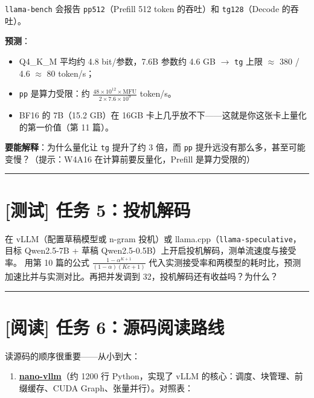 \texttt{llama-bench} 会报告 \texttt{pp512}（Prefill 512 token 的吞吐）和 \texttt{tg128}（Decode 的吞吐）。

\textbf{预测}：
\begin{itemize}
  \item Q4\_K\_M 平均约 4.8 bit/参数，7.6B 参数约 4.6 GB $\rightarrow$ \texttt{tg} 上限 $\approx$ 380 / 4.6 $\approx$ 80 token/s；
  \item \texttt{pp} 是算力受限：约 $\frac{48 \times 10^{12} \times \text{MFU}}{2 \times 7.6 \times 10^9}$ token/s。
  \item BF16 的 7B（15.2 GB）在 16GB 卡上几乎放不下——这就是你这张卡上量化的第一价值（第 11 篇）。
\end{itemize}

\textbf{要能解释}：为什么量化让 \texttt{tg} 提升了约 3 倍，而 \texttt{pp} 提升远没有那么多，甚至可能变慢？（提示：W4A16 在计算前要反量化，Prefill 是算力受限的）

\vspace{0.8em}\hrule\vspace{0.8em}

\section{[测试] 任务 5：投机解码}

在 vLLM（配置草稿模型或 n-gram 投机）或 llama.cpp（\texttt{llama-speculative}，目标 Qwen2.5-7B + 草稿 Qwen2.5-0.5B）上开启投机解码，测单流速度与接受率。
用第 10 篇的公式 $\frac{1 - \alpha^{K+1}}{(1 - \alpha)(Kc + 1)}$ 代入实测接受率和两模型的耗时比，预测加速比并与实测对比。再把并发调到 32，投机解码还有收益吗？为什么？

\vspace{0.8em}\hrule\vspace{0.8em}

\section{[阅读] 任务 6：源码阅读路线}

读源码的顺序很重要——从小到大：

\begin{enumerate}
  \item \textbf{\href{https://github.com/GeeeekExplorer/nano-vllm}{nano-vllm}}（约 1200 行 Python，实现了 vLLM 的核心：调度、块管理、前缀缓存、CUDA Graph、张量并行）。对照表：
\end{enumerate}

